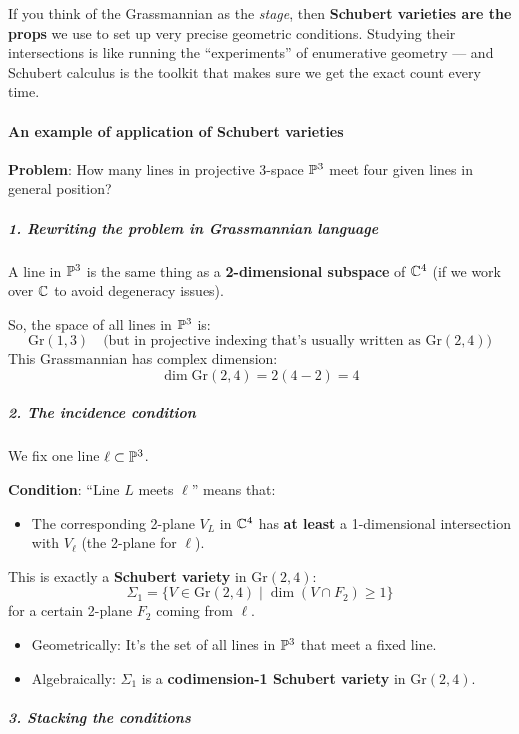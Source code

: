 \documentclass{amsart}
\let\originalmathbb\mathbb
\renewcommand{\mathbb}[1]{%
    \ifstrequal{#1}{1}{\mathbbm{#1}}{\originalmathbb{#1}}%
}
\theoremstyle{plain}
\theoremstyle{definition}
\theoremstyle{remark}
\begin{document}
If you think of the Grassmannian as the \textit{stage}, then \textbf{Schubert varieties are the props} we use to set up very precise geometric conditions. Studying their intersections is like running the “experiments” of enumerative geometry — and Schubert calculus is the toolkit that makes sure we get the exact count every time.

\paragraph{An example of application of Schubert varieties}

\textbf{Problem}: How many lines in projective 3-space $\mathbb{P}^3$ meet four given lines in general position?

\subparagraph{1. Rewriting the problem in Grassmannian language}

A line in $\mathbb{P}^3$ is the same thing as a \textbf{2-dimensional subspace} of $\mathbb{C}^4$ (if we work over $\mathbb{C}$ to avoid degeneracy issues).

So, the space of all lines in $\mathbb{P}^3$ is:
\[
\mathrm{Gr}(1,3) \quad \text{(but in projective indexing that’s usually written as \(\mathrm{Gr}(2,4)\))}
\]
This Grassmannian has complex dimension:
\[
\dim \mathrm{Gr}(2,4) = 2(4 - 2) = 4
\]
\subparagraph{2. The incidence condition}

We fix one line $\ell \subset \mathbb{P}^3$.

\textbf{Condition}: “Line $L$ meets $\ell$” means that:

\begin{itemize}
	\item The corresponding 2-plane $V_L$ in $\mathbb{C}^4$ has \textbf{at least} a 1-dimensional intersection with $V_\ell$ (the 2-plane for $\ell$).
\end{itemize}

This is exactly a \textbf{Schubert variety} in $\mathrm{Gr}(2,4)$:
\[
\Sigma_1 = \{ V \in \mathrm{Gr}(2,4) \mid \dim(V \cap F_2) \ge 1 \}
\]
for a certain 2-plane $F_2$ coming from $\ell$.

\begin{itemize}
	\item Geometrically: It’s the set of all lines in $\mathbb{P}^3$ that meet a fixed line.
	\item Algebraically: $\Sigma_1$ is a \textbf{codimension-1 Schubert variety} in $\mathrm{Gr}(2,4)$.
\end{itemize}

\subparagraph{3. Stacking the conditions}
\end{document}
